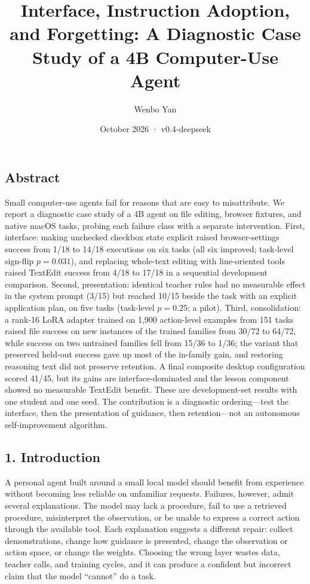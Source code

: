 \documentclass[
  10pt,
]{article}
\title{Interface, Instruction Adoption, and Forgetting: A Diagnostic
Case Study of a 4B Computer-Use Agent}
\author{Wenbo Yan}
\date{October 2026 · v0.4-deepseek}
\begin{document}
\maketitle

\subsection{Abstract}\label{abstract}

Small computer-use agents fail for reasons that are easy to
misattribute. We report a diagnostic case study of a 4B agent on file
editing, browser fixtures, and native macOS tasks, probing each failure
class with a separate intervention. First, interface: making unchecked
checkbox state explicit raised browser-settings success from 1/18 to
14/18 executions on six tasks (all six improved; task-level sign-flip
\(p=0.031\)), and replacing whole-text editing with line-oriented tools
raised TextEdit success from 4/18 to 17/18 in a sequential development
comparison. Second, presentation: identical teacher rules had no
measurable effect in the system prompt (3/15) but reached 10/15 beside
the task with an explicit application plan, on five tasks (task-level
\(p=0.25\); a pilot). Third, consolidation: a rank-16 LoRA adapter
trained on 1,900 action-level examples from 151 tasks raised file
success on new instances of the trained families from 30/72 to 64/72,
while success on two untrained families fell from 15/36 to 1/36; the
variant that preserved held-out success gave up most of the in-family
gain, and restoring reasoning text did not preserve retention. A final
composite desktop configuration scored 41/45, but its gains are
interface-dominated and the lesson component showed no measurable
TextEdit benefit. These are development-set results with one student and
one seed. The contribution is a diagnostic ordering---test the
interface, then the presentation of guidance, then retention---not an
autonomous self-improvement algorithm.

\subsection{1. Introduction}\label{introduction}

A personal agent built around a small local model should benefit from
experience without becoming less reliable on unfamiliar requests.
Failures, however, admit several explanations. The model may lack a
procedure, fail to use a retrieved procedure, misinterpret the
observation, or be unable to express a correct action through the
available tool. Each explanation suggests a different repair: collect
demonstrations, change how guidance is presented, change the observation
or action space, or change the weights. Choosing the wrong layer wastes
data, teacher calls, and training cycles, and it can produce a confident
but incorrect claim that the model ``cannot'' do a task.
\end{document}
